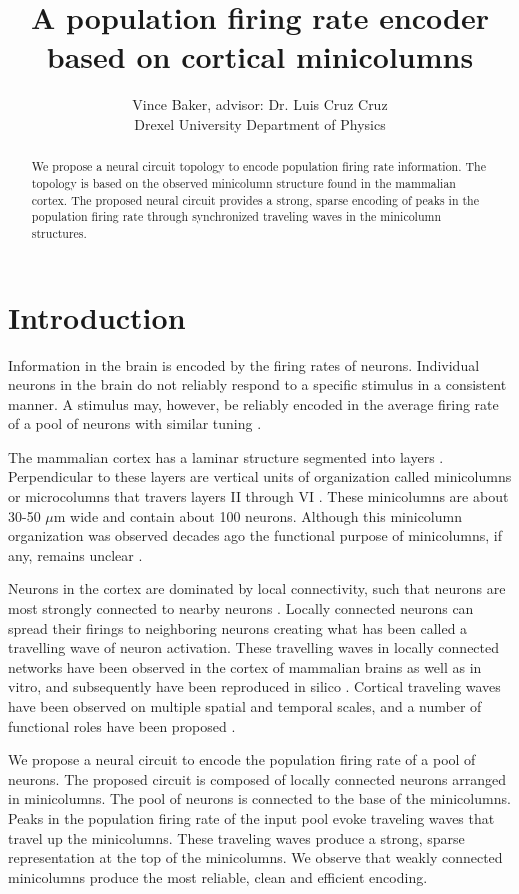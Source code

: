 \documentclass[a4paper,11pt]{article}
\title{A population firing rate encoder based on cortical minicolumns}
\author{Vince Baker, advisor: Dr. Luis Cruz Cruz\\ Drexel University Department of Physics}
\begin{document}
\maketitle

\begin{abstract}
We propose a neural circuit topology to encode population firing rate information.
The topology is based on the observed minicolumn structure found in the mammalian cortex.
The proposed neural circuit provides a strong, sparse encoding of peaks in the population firing rate through synchronized traveling waves in the minicolumn structures.
\end{abstract}

\section{Introduction} 
Information in the brain is encoded by the firing rates of neurons.
Individual neurons in the brain do not reliably respond to a specific stimulus in a consistent manner.
A stimulus may, however, be reliably encoded in the average firing rate of a pool of neurons with similar tuning \cite{trappenberg}.

The mammalian cortex has a laminar structure segmented into layers \cite{banich}.
Perpendicular to these layers are vertical units of organization called minicolumns or microcolumns that travers layers II through VI \cite{buxhoeveden2002}\cite{cruz2005}.
These minicolumns are about 30-50 $\mu$m wide and contain about 100 neurons.
Although this minicolumn organization was observed decades ago the functional purpose of minicolumns, if any, remains unclear \cite{horton2005}.

Neurons in the cortex are dominated by local connectivity, such that neurons are most strongly connected to nearby neurons \cite{levy2012}.
Locally connected neurons can spread their firings to neighboring neurons creating what has been called a travelling wave of neuron activation. 
These travelling waves in locally connected networks have been observed in the cortex of mammalian brains as well as in vitro, and subsequently have been reproduced in silico \cite{keane2015}\cite{ermentrout2001}\cite{wu2008}.
Cortical traveling waves have been observed on multiple spatial and temporal scales, and a number of functional roles have been proposed \cite{muller2018}.

We propose a neural circuit to encode the population firing rate of a pool of neurons.
The proposed circuit is composed of locally connected neurons arranged in minicolumns.
The pool of neurons is connected to the base of the minicolumns.
Peaks in the population firing rate of the input pool evoke traveling waves that travel up the minicolumns.
These traveling waves produce a strong, sparse representation at the top of the minicolumns.
We observe that weakly connected minicolumns produce the most reliable, clean and efficient encoding.
\end{document}
